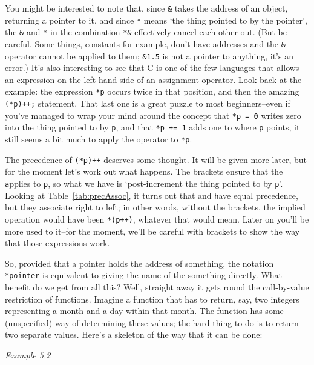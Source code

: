    You might be interested to note that, since \texttt{\&} takes
    the address of an object, returning a pointer to it, and since
    \texttt{*} means `the thing pointed to by the pointer', the
    \texttt{\&} and \texttt{*} in the combination
    \texttt{*\&} effectively cancel each other out. (But be careful.
    Some things, constants for example, don't have addresses and the
    \texttt{\&} operator cannot be applied to them;
    \texttt{\&1.5} is not a pointer to anything, it's an error.) It's
    also interesting to see that C is one of the few languages that allows
    an expression on the left-hand side of an assignment operator. Look back
    at the example: the expression \texttt{*p} occurs twice in that
    position, and then the amazing \texttt{(*p)++;} statement. That last
    one is a great puzzle to most beginners--even if you've managed to
    wrap your mind around the concept that \texttt{*p = 0} writes zero
    into the thing pointed to by \texttt{p}, and that \texttt{*p +=
    1} adds one to where \texttt{p} points, it still seems a bit
    much to apply the \pp{} operator to \texttt{*p}.


   The precedence of \texttt{(*p)++} deserves some thought. It will
    be given more later, but for the moment let's work out what happens. The
    brackets ensure that the \texttt * applies to \texttt p,
    so what we have is `post-increment the thing pointed to by \texttt p'.
    Looking at Table~\ref{tab:precAssoc},
    it turns out that \pp{} and \texttt * have equal precedence,
    but they
    associate right to left; in other words, without the brackets, the
    implied operation would have been \texttt{*(p++)},
    whatever that would mean.
    Later on you'll be more used to it--for the moment, we'll be careful
    with brackets to show the way that those expressions work.


   So, provided that a pointer holds the address of something, the
    notation \texttt{*pointer} is equivalent to giving the name of the
    something directly. What benefit do we get from all this? Well, straight
    away it gets round the call-by-value restriction of functions. Imagine
    a function that has to return, say, two integers representing a month
    and a day within that month. The function has some (unspecified) way of
    determining these values; the hard thing to do is to return two separate
    values. Here's a skeleton of the way that it can be done:


    \begin{center}\textit{Example 5.2}\end{center}


